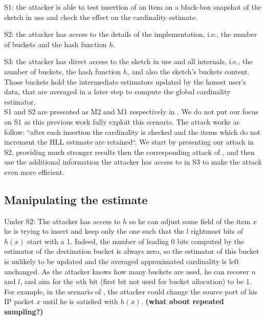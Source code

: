 \documentclass{IEEEtran}
\begin{document}
S1: the attacker is able to test insertion of an item on a black-box snapshot of the sketch in use and check the effect on the cardinality estimate.

S2: the attacker has access to the details of the implementation, i.e., the number of buckets and the hash function $h$.

S3: the attacker has direct access to the sketch in use and all internals, i.e., the number of buckets, the hash function $h$, and also the sketch's buckets content. Those buckets hold the intermediate estimators updated by the honest user's data, that are averaged in a later step to compute the global cardinality estimator.\\

S1 and S2 are presented as M2 and M1 respectively in \cite{hllvuln}. We do not put our focus on S1 as this previous work fully exploit this scenario. The attack works as follow: ``after each insertion the cardinality is checked and the items which do not increment the HLL estimate are retained``. We start by presenting our attack in S2, providing much stronger results then the corresponding attack of \cite{hllvuln}, and then use the additional information the attacker has access to in S3 to make the attack even more efficient. 

\subsection{Manipulating the estimate}
Under S2: The attacker has access to $h$ so he can adjust some field of the item $x$ he is trying to insert and keep only the one such that the $l$ rightmost bits of $h(x)$ start with a 1. Indeed, the number of leading 0 bits computed by the estimator of the destination bucket is always zero, so the estimator of this bucket is unlikely to be updated and the averaged approximated cardinality is left unchanged. As the attacker knows how many buckets are used, he can recover $n$ and $l$, and aim for the $n$th bit (first bit not used for bucket allocation) to be 1. For example, in the scenario of \cite{portscanhll}, the attacker could change the source port of his IP packet $x$ until he is satisfied with $h(x)$. \textbf{(what about repeated sampling?)}\\
\end{document}

